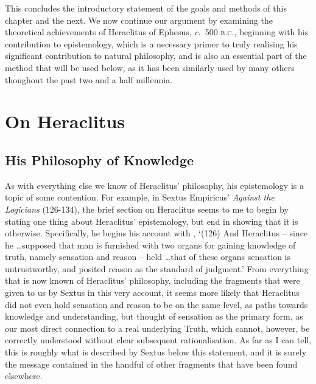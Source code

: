 This concludes the introductory statement of the goals and methods of this chapter and the next. We now continue our argument by examining the theoretical achievements of Heraclitus of Ephesus, \textit{c}.~500 \textsc{b.c.}, beginning with his contribution to epistemology, which is a necessary primer to truly realising his significant contribution to natural philosophy, and is also an essential part of the method that will be used below, as it has been similarly used by many others thoughout the past two and a half millennia.
\section{On Heraclitus\label{sec_OH}}
\subsection{His Philosophy of Knowledge\label{subsec_HPN}}
As with everything else we know of Heraclitus' philosophy, his epistemology is a topic of some contention. For example, in Sextus Empiricus' \textit{Against the Logicians} \cite{Sextus2005} (126-134), the brief section on Heraclitus seems to me to begin by stating one thing about Heraclitus' epistemology, but end in showing that it is otherwise. Specifically, he begins his account with \cite{Robinson1987}, `(126) And Heraclitus -- since he \ldots supposed that man is furnished with two organs for gaining knowledge of truth, namely sensation and reason -- held \ldots that of these organs sensation is untrustworthy, and posited reason as the standard of judgment.' From everything that is now known of Heraclitus' philosophy, including the fragments that were given to us by Sextus in this very account, it seems more likely that Heraclitus did not even hold sensation and reason to be on the same level, as paths towards knowledge and understanding, but thought of sensation as the primary form, as our most direct connection to a real underlying Truth, which cannot, however, be correctly understood without clear subsequent rationalisation. As far as I can tell, this is roughly what is described by Sextus below this statement, and it is surely the message contained in the handful of other fragments that have been found elsewhere. 

